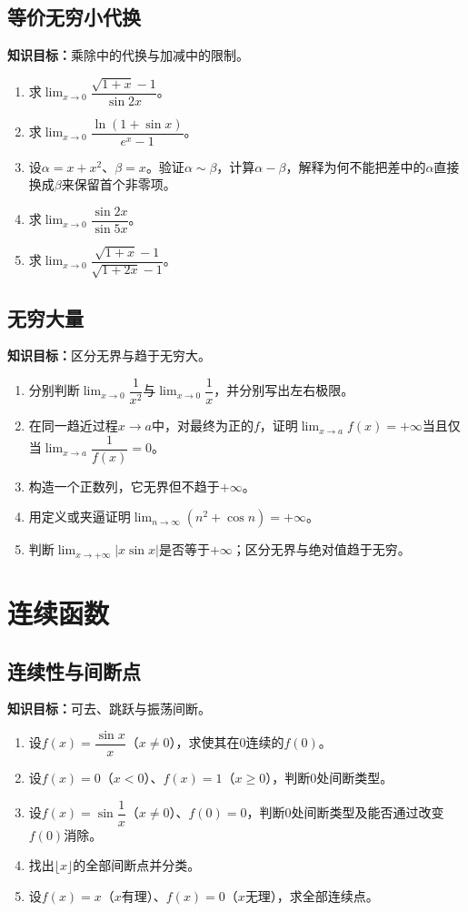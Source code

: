 \documentclass[11pt,a4paper,fontset=fandol]{ctexrep}
\newcommand{\goal}[1]{\textbf{知识目标：}#1\par}
\begin{document}
\subsection{等价无穷小代换}
\goal{乘除中的代换与加减中的限制。}
\begin{enumerate}
\item 求$\lim_{x\to0}\dfrac{\sqrt{1+x}-1}{\sin2x}$。
\item 求$\lim_{x\to0}\dfrac{\ln(1+\sin x)}{e^x-1}$。
\item 设$\alpha=x+x^2$、$\beta=x$。验证$\alpha\sim\beta$，计算$\alpha-\beta$，解释为何不能把差中的$\alpha$直接换成$\beta$来保留首个非零项。
\item 求$\lim_{x\to0}\dfrac{\sin2x}{\sin5x}$。
\item 求$\lim_{x\to0}\dfrac{\sqrt{1+x}-1}{\sqrt{1+2x}-1}$。
\end{enumerate}
\subsection{无穷大量}
\goal{区分无界与趋于无穷大。}
\begin{enumerate}
\item 分别判断$\lim_{x\to0}\dfrac{1}{x^2}$与$\lim_{x\to0}\dfrac{1}{x}$，并分别写出左右极限。
\item 在同一趋近过程$x\to a$中，对最终为正的$f$，证明$\lim_{x\to a}f(x)=+\infty$当且仅当$\lim_{x\to a}\dfrac{1}{f(x)}=0$。
\item 构造一个正数列，它无界但不趋于$+\infty$。
\item 用定义或夹逼证明$\lim_{n\to\infty}(n^2+\cos n)=+\infty$。
\item 判断$\lim_{x\to+\infty}|x\sin x|$是否等于$+\infty$；区分无界与绝对值趋于无穷。
\end{enumerate}
\section{连续函数}
\subsection{连续性与间断点}
\goal{可去、跳跃与振荡间断。}
\begin{enumerate}
\item 设$f(x)=\dfrac{\sin x}{x}$（$x\ne0$），求使其在$0$连续的$f(0)$。
\item 设$f(x)=0$（$x<0$）、$f(x)=1$（$x\ge0$），判断$0$处间断类型。
\item 设$f(x)=\sin\dfrac{1}{x}$（$x\ne0$）、$f(0)=0$，判断$0$处间断类型及能否通过改变$f(0)$消除。
\item 找出$\lfloor x\rfloor$的全部间断点并分类。
\item 设$f(x)=x$（$x$有理）、$f(x)=0$（$x$无理），求全部连续点。
\end{enumerate}
\end{document}
